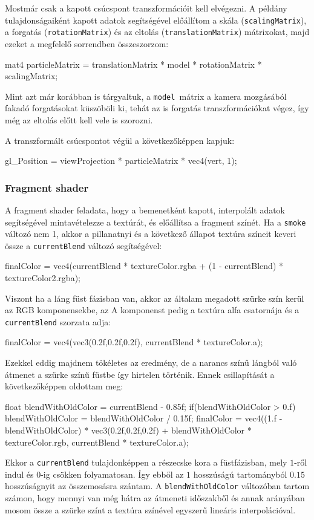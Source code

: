 Mostmár csak a kapott csúcspont transzformációit kell elvégezni. A példány tulajdonságaiként kapott adatok segítségével előállítom a skála (\texttt{scalingMatrix}), a forgatás (\texttt{rotationMatrix}) és az eltolás (\texttt{translationMatrix}) mátrixokat, majd ezeket a megfelelő sorrendben összeszorzom:
\begin{cpp}
mat4 particleMatrix = translationMatrix * model * rotationMatrix
							 * scalingMatrix;
\end{cpp}
Mint azt már korábban is tárgyaltuk, a \texttt{model }mátrix a kamera mozgásából fakadó forgatásokat küszöböli ki, tehát az is forgatás transzformációkat végez, így még az eltolás előtt kell vele is szorozni.

A transzformált csúcspontot végül a következőképpen kapjuk:
\begin{cpp}
gl_Position = viewProjection * particleMatrix * vec4(vert, 1);
\end{cpp}


\subsubsection{Fragment shader}
A fragment shader feladata, hogy a bemenetként kapott, interpolált adatok segítségével mintavételezze a textúrát, és előállítsa a fragment színét. Ha a \texttt{smoke} változó nem 1, akkor a pillanatnyi és a következő állapot textúra színeit keveri össze a \texttt{currentBlend} változó segítségével:
\begin{cpp}
finalColor = vec4(currentBlend * textureColor.rgba 
	     + (1 - currentBlend) * textureColor2.rgba);
\end{cpp}

Viszont ha a láng füst fázisban van, akkor az általam megadott szürke szín kerül az RGB komponensekbe, az A komponenst pedig a textúra alfa csatornája és a \texttt{currentBlend} szorzata adja: 
\begin{cpp}
finalColor = vec4(vec3(0.2f,0.2f,0.2f), currentBlend * textureColor.a);
\end{cpp}

Ezekkel eddig majdnem tökéletes az eredmény, de a narancs színű lángból való átmenet a szürke színű füstbe így hirtelen történik. Ennek csillapítását a következőképpen oldottam meg:
\begin{cpp}
float blendWithOldColor = currentBlend - 0.85f;
if(blendWithOldColor > 0.f) {
   blendWithOldColor = blendWithOldColor / 0.15f;
   finalColor = vec4((1.f - blendWithOldColor) * vec3(0.2f,0.2f,0.2f) 
   + blendWithOldColor * textureColor.rgb, currentBlend * textureColor.a);
}
\end{cpp}
Ekkor a \texttt{currentBlend} tulajdonképpen a részecske kora a füstfázisban, mely $1$-ről indul és $0$-ig csökken folyamatosan. Így ebből az $1$ hosszúságú tartományból $0.15$ hosszúságnyit az összemosásra szántam. A \texttt{blendWithOldColor} változóban tartom számon, hogy mennyi van még hátra az átmeneti időszakből és annak arányában mosom össze a szürke színt a textúra színével egyszerű lineáris interpolációval.

